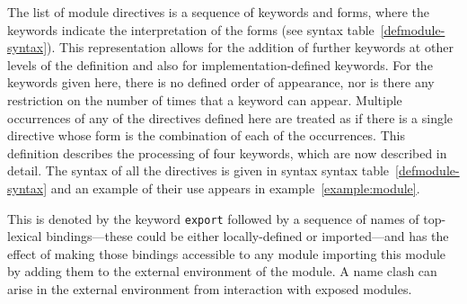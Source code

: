 \label{directives}
%
\begin{optDefinition}
The list of module directives is a sequence of keywords and forms, where the
keywords indicate the interpretation of the forms (see syntax
table~\ref{defmodule-syntax}).  This representation allows for the addition of
further keywords at other levels of the definition and also for
implementation-defined keywords.  For the keywords given here, there is no defined order of
appearance, nor is there any restriction on the number of times that a keyword
can appear.  Multiple occurrences of any of the directives defined here are
treated as if there is a single directive whose form is the combination of each
of the occurrences.  This definition describes the processing of four keywords,
which are now described in detail.  The syntax of all the directives is given in
syntax syntax table~\ref{defmodule-syntax} and an example of their use appears
in example~\ref{example:module}.
\end{optDefinition}
%
%
\begin{optDefinition}
This is denoted by the keyword {\tt export} followed by a sequence of
names of top-lexical bindings---these could be either locally-defined or
imported---and has the effect of making those bindings accessible to any module
importing this module by adding them to the external environment of the module.
A name clash can arise in the external environment from interaction with exposed
modules.
\end{optDefinition}
%
%
\label{import}
%
